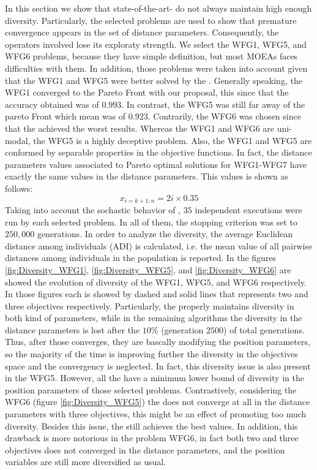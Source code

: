 In this section we show that state-of-the-art-\MOEAS{} do not always maintain high enough diversity.
%
Particularly, the selected problems are used to show that premature convergence appears in the set of distance parameters.
%
Consequently, the operators involved lose its exploraty strength.
%
We select the WFG1, WFG5, and WFG6 problems, because they have simple definition, but most MOEAs faces difficulties with them. 
%
In addition, those problems were taken into account given that the WFG1 and WFG5 were better solved by the \VSDMOEA{}.
%
Generally speaking, the WFG1 converged to the Pareto Front with our proposal, this since that the accuracy obtained was of $0.993$.
%
In contrast, the WFG5 was still far away of the pareto Front which \HV{} mean  was of $0.923$.
%
Contrarily, the WFG6 was chosen since that the \VSDMOEA{} achieved the worst results.
%
Whereas the WFG1 and WFG6 are uni-modal, the WFG5 is a highly deceptive problem.
%
Also, the WFG1 and WFG5 are conformed by separable properties in the objective functions.
%
In fact, the distance parameters values associated to Pareto optimal solutions for WFG1-WFG7 have exactly the same values in the distance parameters.
%
This values is shown as follows:
\begin{equation}
   x_{i=k+1:n} = 2i \times 0.35
\end{equation}
%
Taking into account the sochastic behavior of \MOEAS{}, $35$ independent executions were run by each selected problem.
%
In all of them, the stopping criterion was set to $250,000$ generations.
%
In order to analyze the diversity, the average Euclidean distance among individuals (ADI) is calculated, i.e. the mean value of all pairwise distances among individuals in the population is reported.
%
In the figures \ref{fig:Diversity_WFG1}, \ref{fig:Diversity_WFG5}, and \ref{fig:Diversity_WFG6} are showed the evolution of diversity of the WFG1, WFG5, and WFG6 respectively.
%
In those figures each \MOEA{} is showed by dashed and solid lines that represents two and three objectives respectively.
%
Particularly, the \VSDMOEA{} properly maintains diversity in both kind of parameters, while in the remaining algorithms the diversity in the distance parameters is lost after the $10\%$ (generation $2500$) of total generations.
%
Thus, after those \MOEAS{} converges, they are bascally modifying the position parameters, so the majority of the time is improving further the diversity in the objectives space and the convergency is neglected.
%
In fact, this diversity issue is also present in the WFG5.
%
However, all the \MOEAS{} have a minimum lower bound of diversity in the position parameters of those selected problems.
%
Contrastively, considering the WFG6 (figure \ref{fig:Diversity_WFG5}) the \VSDMOEA{} does not converge at all in the distance parameters with three objectives, this might be an effect of promoting too much diversity.
%
Besides this issue, the \VSDMOEA{} still achieves the best \HV{} values.
%
In addition, this drawback is more notorious in the problem WFG6, in fact both two and three objectives does not converged in the distance parameters, and the position variables are still more diversified as usual.


